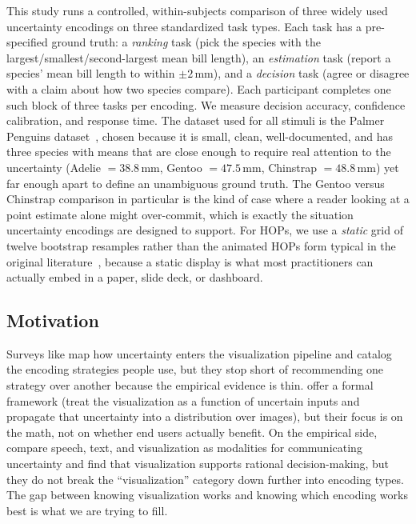 \documentclass{article}
\begin{document}
This study runs a controlled, within-subjects comparison of three
widely used uncertainty encodings on three standardized task types.
Each task has a pre-specified ground truth: a \emph{ranking} task (pick
the species with the largest/smallest/second-largest mean bill length),
an \emph{estimation} task (report a species' mean bill length to within
$\pm 2$\,mm), and a \emph{decision} task (agree or disagree with a
claim about how two species compare).  Each participant completes one
such block of three tasks per encoding.  We measure decision accuracy,
confidence calibration, and response time.  The dataset used for all
stimuli is the Palmer Penguins dataset~\cite{horst2020}, chosen because
it is small, clean, well-documented, and has three species with means
that are close enough to require real attention to the uncertainty
(Adelie $= 38.8$\,mm, Gentoo $= 47.5$\,mm, Chinstrap $= 48.8$\,mm) yet
far enough apart to define an unambiguous ground truth.  The Gentoo
versus Chinstrap comparison in particular is the kind of case where a
reader looking at a point estimate alone might over-commit, which is
exactly the situation uncertainty encodings are designed to
support.  For HOPs, we use a \emph{static} grid of twelve bootstrap
resamples rather than the animated HOPs form typical in the original
literature~\cite{hullman2015}, because a static display is what most
practitioners can actually embed in a paper, slide deck, or dashboard.

\subsection{Motivation}

Surveys like \textcite{mehta2022} map how uncertainty enters the
visualization pipeline and catalog the encoding strategies people use,
but they stop short of recommending one strategy over another because
the empirical evidence is thin.  \textcite{petek2025} offer a formal
framework (treat the visualization as a function of uncertain inputs
and propagate that uncertainty into a distribution over images), but
their focus is on the math, not on whether end users actually benefit.
On the empirical side, \textcite{stokes2024} compare speech, text, and
visualization as modalities for communicating uncertainty and find that
visualization supports rational decision-making, but they do not break
the ``visualization'' category down further into encoding types.  The
gap between knowing visualization works and knowing which encoding
works best is what we are trying to fill.
\end{document}
